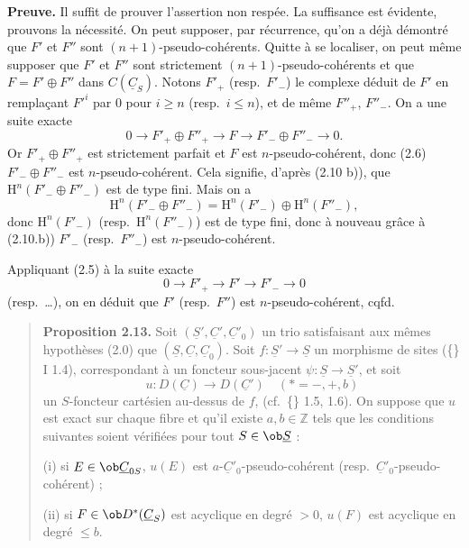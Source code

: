 \textbf{Preuve.} Il suffit de prouver l'assertion non respée. La suffisance est évidente, prouvons la nécessité. On peut supposer, par récurrence, qu'on a déjà démontré que $F'$ et $F''$ sont $(n+1)$-pseudo-cohérents. Quitte à se localiser, on peut même supposer que $F'$ et $F''$ sont strictement $(n+1)$-pseudo-cohérents et que $F = F' \oplus F''$ dans $C(\underline{C}_S)$. Notons $F'_+$ (resp.\ $F'_-$) le complexe déduit de $F'$ en remplaçant $F'^i$ par $0$ pour $i \geqslant n$ (resp.\ $i \leqslant n$), et de même $F''_+$, $F''_-$. On a une suite exacte
\[
0 \longrightarrow F'_+ \oplus F''_+ \longrightarrow F \longrightarrow F'_- \oplus F''_- \longrightarrow 0.
\]
Or $F'_+ \oplus F''_+$ est strictement parfait et $F$ est $n$-pseudo-cohérent, donc (2.6) $F'_- \oplus F''_-$ est $n$-pseudo-cohérent. Cela signifie, d'après (2.10 b)), que $\mathrm{H}^n(F'_- \oplus F''_-)$ est de type fini. Mais on a
\[
\mathrm{H}^n(F'_- \oplus F''_-) = \mathrm{H}^n(F'_-) \oplus \mathrm{H}^n(F''_-),
\]
donc $\mathrm{H}^n(F'_-)$ (resp.\ $\mathrm{H}^n(F''_-)$) est de type fini, donc à nouveau grâce à (2.10.b)) $F'_-$ (resp.\ $F''_-$) est $n$-pseudo-cohérent.

Appliquant (2.5) à la suite exacte
\[
0 \longrightarrow F'_+ \longrightarrow F' \longrightarrow F'_- \longrightarrow 0
\]
(resp.\ \ldots), on en déduit que $F'$ (resp.\ $F''$) est $n$-pseudo-cohérent, cqfd.

\begin{quote}
\textbf{Proposition 2.13.} Soit $(\underline{S}', \underline{C}', \underline{C}'_0)$ un trio satisfaisant aux mêmes hypothèses (2.0) que $(\underline{S}, \underline{C}, \underline{C}_0)$. Soit $f : \underline{S}' \to \underline{S}$ un morphisme de sites (\{\} I 1.4), correspondant à un foncteur sous-jacent $\psi : \underline{S} \to \underline{S}'$, et soit
\[
u : D(\underline{C}) \longrightarrow D(\underline{C}') \quad (* = -, +, b)
\]
un $S$-foncteur cartésien au-dessus de $f$, (cf.\ \{\} 1.5, 1.6). On suppose que $u$ est exact sur chaque fibre et qu'il existe $a, b \in \mathbb{Z}$ tels que les conditions suivantes soient vérifiées pour tout $S \in \ob \underline{S}$ :

\quad\textup{(i)} si $E \in \ob \underline{C}_{0S}$, $u(E)$ est $a$-$\underline{C}'_0$-pseudo-cohérent (resp.\ $\underline{C}'_0$-pseudo-cohérent) ;

\quad\textup{(ii)} si $F \in \ob D^*(\underline{C}_S)$ est acyclique en degré $> 0$, $u(F)$ est acyclique en degré $\leqslant b$.
\end{quote}

